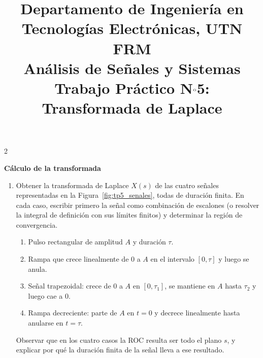 \documentclass[10pt,a4paper]{article}
\title{%
	{\normalsize Departamento de Ingeniería en Tecnologías Electrónicas, UTN FRM}\\[0.1cm]
	{\large Análisis de Señales y Sistemas}\\[0.15cm]
	{\normalsize Trabajo Práctico N$^{\text o}$5: Transformada de Laplace}%
}
\author{}
\date{}
\begin{document}
	\maketitle
	\thispagestyle{fancy}

	\begin{multicols}{2}

		\label{sec:enun}

		\textbf{Cálculo de la transformada}
		\begin{enumerate}
			\item Obtener la transformada de Laplace $X(s)$ de las cuatro señales representadas en la Figura~\ref{fig:tp5_senales}, todas de duración finita. En cada caso, escribir primero la señal como combinación de escalones (o resolver la integral de definición con sus límites finitos) y determinar la región de convergencia.
			\begin{enumerate}
				\item Pulso rectangular de amplitud $A$ y duración $\tau$.
				\item Rampa que crece linealmente de $0$ a $A$ en el intervalo $[0, \tau]$ y luego se anula.
				\item Señal trapezoidal: crece de $0$ a $A$ en $[0,\tau_1]$, se mantiene en $A$ hasta $\tau_2$ y luego cae a $0$.
				\item Rampa decreciente: parte de $A$ en $t=0$ y decrece linealmente hasta anularse en $t=\tau$.
			\end{enumerate}
			Observar que en los cuatro casos la ROC resulta ser todo el plano $s$, y explicar por qué la duración finita de la señal lleva a ese resultado.

			\begin{center}
				
				\label{fig:tp5_senales}
			\end{center}


\end{enumerate}
\end{multicols}
\end{document}
